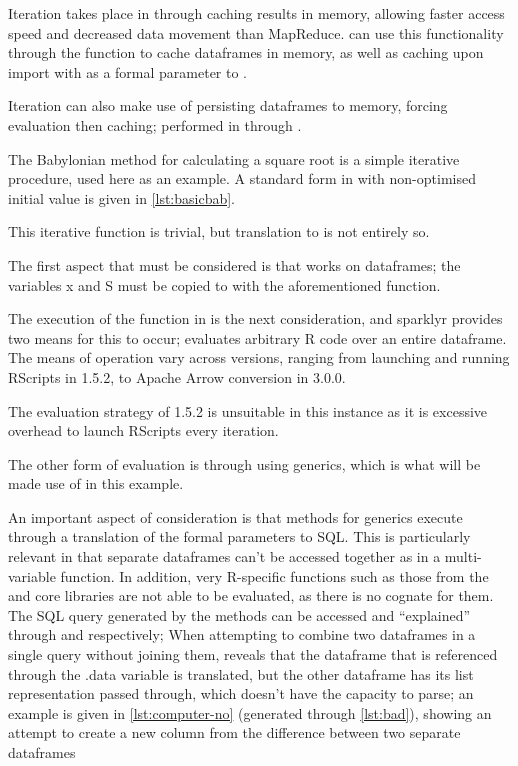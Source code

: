 Iteration takes place in  through caching results in memory, allowing faster access speed and decreased data movement than MapReduce\cite{zaharia2010spark}.
 can use this functionality
through the  function to
cache  dataframes in memory, as well as caching upon import with
 as a formal parameter to .

Iteration can also make use of persisting  dataframes to memory, forcing evaluation then caching; performed in  through .

The Babylonian method for calculating a square root is a simple iterative procedure, used here as an example.
A standard form in \R{} with non-optimised initial value is given in \cref{lst:basicbab}.


This iterative function is trivial, but translation to  is not entirely so.

The first aspect that must be considered is that  works on  dataframes; the variables x and S must be copied to  with the aforementioned  function.

The execution of the function in  is the next consideration, and sparklyr provides two means for this to occur;  evaluates arbitrary R code over an entire dataframe.
The means of operation vary across  versions, ranging from launching and running RScripts in  1.5.2, to Apache Arrow conversion in  3.0.0.

The evaluation strategy of 1.5.2 is unsuitable in this instance as it is excessive overhead to launch RScripts every iteration.

The other form of evaluation is through using  generics, which is what will be made use of in this example.

An important aspect of consideration is that  methods for  generics execute through a translation of the formal parameters to  SQL.
This is particularly relevant in that separate  dataframes can't be accessed together as in a multi-variable function.
In addition, very R-specific functions such as those from the  and  core libraries are not able to be evaluated, as there is no  cognate for them.
The SQL query generated by the methods can be accessed and ``explained'' through  and  respectively; When attempting to combine two  dataframes in a single query without joining them,  reveals that the dataframe that is referenced through the .data variable is translated, but the other dataframe has its list representation passed through, which  doesn't have the capacity to parse; an example is given in \cref{lst:computer-no} (generated through \cref{lst:bad}), showing an attempt to create a new column from the difference between two separate dataframes

